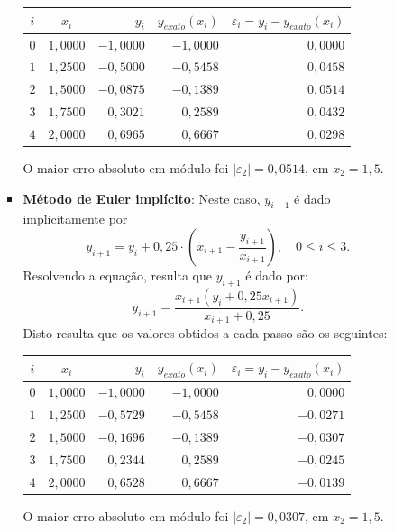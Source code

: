 \documentclass[12pt,a4paper]{article}
\begin{document}
\begin{enumerate}
\begin{enumerate}
\begin{itemize}
\medskip
\begin{center}
\begin{tabular}{ccrrr}
\hline
$i$ & $x_i$ & $y_i$ & $y_{exato}(x_i)$ & $\varepsilon_i = y_i-y_{exato}(x_i)$ \\ \hline
$0$ & $1,0000$ & $-1,0000$ & $-1,0000$ & $0,0000$ \\
$1$ & $1,2500$ & $-0,5000$ & $-0,5458$ & $0,0458$ \\
$2$ & $1,5000$ & $-0,0875$ & $-0,1389$ & $0,0514$ \\
$3$ & $1,7500$ & $ 0,3021$ & $ 0,2589$ & $0,0432$ \\
$4$ & $2,0000$ & $ 0,6965$ & $ 0,6667$ & $0,0298$ \\
\hline
\end{tabular}
\end{center}
\medskip
O maior erro absoluto em módulo foi $|\varepsilon_2| = 0,0514$, em $x_2 = 1,5$.

\item \textbf{Método de Euler implícito}: Neste caso, $y_{i + 1}$ é dado implicitamente por
\[
y_{i + 1}
= y_{i} + 0,25 \cdot \left( x_{i + 1} - \frac{y_{i + 1}}{x_{i + 1}} \right),
\quad 0 \leq i \leq 3.
\]
Resolvendo a equação, resulta que $y_{i + 1}$ é dado por:
\[
y_{i + 1}
= \frac{x_{i + 1} \left(y_{i} + 0,25 x_{i + 1}\right)}{ x_{i + 1} + 0,25 }.
\]
Disto resulta que os valores obtidos a cada passo são os seguintes:

\medskip
\begin{center}
\begin{tabular}{ccrrr}
\hline
$i$ & $x_i$ & $y_i$ & $y_{exato}(x_i)$ & $\varepsilon_i = y_i-y_{exato}(x_i)$ \\ \hline
$0$ & $1,0000$ & $-1,0000$ & $-1,0000$ & $ 0,0000$ \\
$1$ & $1,2500$ & $-0,5729$ & $-0,5458$ & $-0,0271$ \\
$2$ & $1,5000$ & $-0,1696$ & $-0,1389$ & $-0,0307$ \\
$3$ & $1,7500$ & $ 0,2344$ & $ 0,2589$ & $-0,0245$ \\
$4$ & $2,0000$ & $ 0,6528$ & $ 0,6667$ & $-0,0139$ \\
\hline
\end{tabular}
\end{center}
\medskip
O maior erro absoluto em módulo foi $|\varepsilon_2| = 0,0307$, em $x_2 = 1,5$.



\end{itemize}
\end{enumerate}
\end{enumerate}
\end{document}

